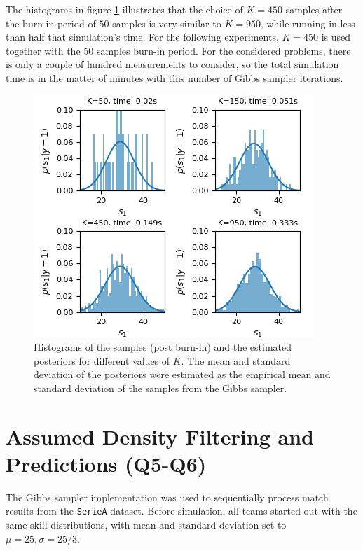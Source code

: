 \documentclass{article}
\begin{document}
	The histograms in figure \ref{fig:q_4_2} illustrates that the choice of $K=450$ samples after the burn-in period of $50$ samples is very similar to $K=950$, while running in less than half that simulation's time. For the following experiments, $K=450$ is used together with the $50$ samples burn-in period. For the considered problems, there is only a couple of hundred measurements to consider, so the total simulation time is in the matter of minutes with this number of Gibbs sampler iterations. 
	
	\begin{figure}
		\begin{center}
		\includegraphics[width=\linewidth]{q_4_2_final}
		\end{center}
		\caption{Histograms of the samples (post burn-in) and the estimated posteriors for different values of $K$. The mean and standard deviation of the posteriors were estimated as the empirical mean and standard deviation of the samples from the Gibbs sampler.}
		\label{fig:q_4_2}
	\end{figure}
		
	\section{Assumed Density Filtering and Predictions (Q5-Q6)}
	The Gibbs sampler implementation was used to sequentially process match results from the \texttt{SerieA} dataset.
	Before simulation, all teams started out with the same skill distributions, with mean and standard deviation set to $ \mu=25, \sigma=25/3 $.
	
\end{document}

